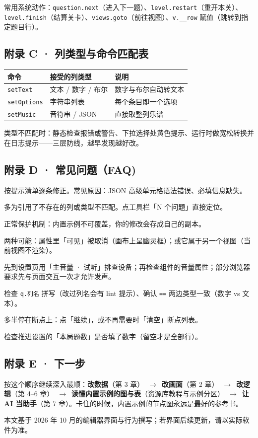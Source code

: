 \documentclass[UTF8,a4paper,zihao=-4]{ctexart}
\newcommand{\code}[1]{\texttt{#1}}   %
\newcommand{\ra}{\ $\rightarrow$\ }  %
\begin{document}
常用系统动作：\code{question.next}（进入下一题）、\code{level.restart}（重开本关）、\code{level.finish}（结算关卡）、\code{views.goto}（前往视图）、\code{v.\_\_row} 赋值（跳转到指定题目行）。

\subsection*{附录 C · 列类型与命令匹配表}

\begin{center}
\begin{tabular}{lll}
\toprule
命令 & 接受的列类型 & 说明 \\
\midrule
\code{setText} & 文本 / 数字 / 布尔 & 数字与布尔自动转文本 \\
\code{setOptions} & 字符串列表 & 每个条目即一个选项 \\
\code{setMusic} & 音符串 / JSON & 直接取整列乐谱 \\
\bottomrule
\end{tabular}
\end{center}

类型不匹配时：静态检查报错或警告、下拉选择处黄色提示、运行时做宽松转换并在日志提示——三层防线，越早发现越好改。

\subsection*{附录 D · 常见问题（FAQ)}

\begin{description}[style=nextline]
  \item[保存出现红条？] 按提示清单逐条修正。常见原因：JSON 高级单元格语法错误、必填信息缺失。
  \item[出现黄色 lint 提示？] 多为引用了不存在的列或类型不匹配。点工具栏「N 个问题」直接定位。
  \item[编辑内置示例后保存提示「另存为副本」？] 正常保护机制：内置示例不可覆盖，你的修改会存成自己的副本。
  \item[组件在游玩页不见了？] 两种可能：属性里「可见」被取消（画布上呈幽灵框）；或它属于另一个视图（当前视图不渲染）。
  \item[试运行没有声音？] 先到设置页用「主音量 · 试听」排查设备；再检查组件的音量属性；部分浏览器要求先与页面交互一次才允许发声。
  \item[表达式不生效？] 检查 \code{q.列名} 拼写（改过列名会有 lint 提示）、确认 \code{==} 两边类型一致（数字 vs 文本）。
  \item[调试启动后停住不动？] 多半停在断点上：点「继续」，或不再需要时「清空」断点列表。
  \item[加了行但游玩时题数不对？] 检查推进设置的「本局题数」是否填了数字（留空才是全部行）。
\end{description}

\subsection*{附录 E · 下一步}

按这个顺序继续深入最顺：\textbf{改数据}（第 3 章）\ra \textbf{改画面}（第 2 章）\ra \textbf{改逻辑}（第 4--6 章）\ra \textbf{读懂内置示例的图与表}（资源库教程与示例分区）\ra \textbf{让 AI 当助手}（第 7 章）。卡住的时候，内置示例的节点图永远是最好的参考书。

\vspace{2em}
\begin{center}
\small 本文基于 2026 年 10 月的编辑器界面与行为撰写；若界面后续更新，请以实际软件为准。
\end{center}
\end{document}
